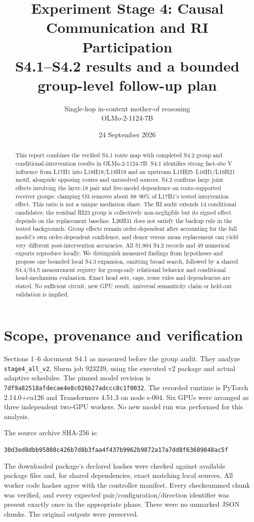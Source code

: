 \documentclass[11pt,a4paper]{article}
\title{Experiment Stage 4: Causal Communication and RI Participation\\
\large S4.1--S4.2 results and a bounded group-level follow-up plan}
\author{Single-hop in-context mother-of reasoning\\OLMo-2-1124-7B}
\date{24 September 2026}
\newcommand{\file}[1]{\nolinkurl{#1}}
\begin{document}
\maketitle

\begin{abstract}
This report combines the verified S4.1 route map with completed S4.2 group and conditional-intervention results in OLMo-2-1124-7B. S4.1 identifies strong fact-site V influence from L17H1 into L18H18/L18H19 and an upstream L15H25--L16H1/L16H21 motif, alongside opposing routes and unresolved sources. S4.2 confirms large joint effects involving the layer-18 pair and live-model dependence on route-supported receiver groups: clamping O3 removes about 88--90\% of L17H1's tested intervention effect. This ratio is not a unique mediation share. The RI audit extends 14 conditional candidates; the residual RI23 group is collectively non-negligible but its signed effect depends on the replacement baseline. L26H31 does not satisfy the backup rule in the tested backgrounds. Group effects remain order-dependent after accounting for the full model's own order-dependent confidence, and donor versus mean replacement can yield very different post-intervention accuracies. All 51,904 S4.2 records and 49 numerical exports reproduce locally. We distinguish measured findings from hypotheses and propose one bounded local S4.3 expansion, omitting broad search, followed by a shared S4.4/S4.5 measurement registry for group-only relational behavior and conditional head-mechanism evaluation. Exact head sets, caps, reuse rules and dependencies are stated. No sufficient circuit, new GPU result, universal semanticity claim or held-out validation is implied.
\end{abstract}

\newpage
\setcounter{tocdepth}{1}
\tableofcontents
\newpage
\section{Scope, provenance and verification}
\label{sec:verification}
Sections 1--6 document S4.1 as measured before the group audit. They analyze \file{stage4_all_v2}, Slurm job 923239, using the executed v2 package and actual adaptive schedules. The pinned model revision is
\file{7df9a82518afdecae4e8c026b27adccc8c1f0032}. The recorded runtime is PyTorch 2.14.0+cu126 and Transformers 4.51.3 on node s-004. Six GPUs were arranged as three independent two-GPU workers. No new model run was performed for this analysis.

The source archive SHA-256 is:
\par{\footnotesize\file{30d3ed8dbb95808c426b7d8b3faa4f437b9962b9872a17a7dd8f63689848ac5f}}\par
The downloaded package's declared hashes were checked against available package files and, for shared dependencies, exact matching local sources. All worker code hashes agree with the controller manifest. Every checksummed chunk was verified, and every expected pair/configuration/direction identifier was present exactly once in the appropriate phase. There were no unmarked JSON chunks. The original outputs were preserved.
\end{document}
